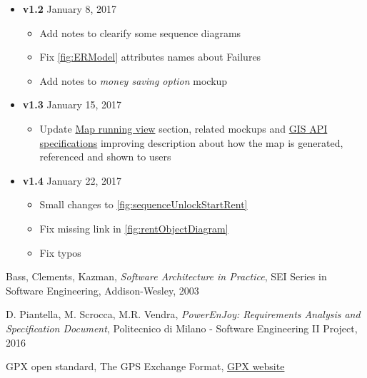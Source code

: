 \begin{appendices}
\begin{itemize}
\begin{itemize}
		\end{itemize}
		\item \textbf{v1.2} January 8, 2017
		\begin{itemize}
			\item Add notes to clearify some sequence diagrams
			\item Fix \autoref{fig:ERModel} attributes names about Failures
			\item Add notes to \emph{money saving option} mockup
		\end{itemize}
		\item  \textbf{v1.3} January 15, 2017
		\begin{itemize}
			\item Update \hyperref[sec:mapRunView]{Map running view} section, related mockups and \hyperref[sec:gis]{GIS API specifications} improving description about how the map is generated, referenced  and shown to users
		\end{itemize}
		\item  \textbf{v1.4} January 22, 2017
		\begin{itemize}
			\item Small changes to \autoref{fig:sequenceUnlockStartRent}
			\item Fix missing link in \autoref{fig:rentObjectDiagram}
			\item Fix typos 
		\end{itemize}
	\end{itemize}
	
\end{appendices}


\begin{thebibliography}{9}

Bass, Clements, Kazman, \emph{Software Architecture in Practice}, SEI Series in Software Engineering, Addison-­Wesley, 2003

D. Piantella, M. Scrocca, M.R. Vendra, \emph{PowerEnJoy: Requirements Analysis and Specification Document}, Politecnico di Milano - Software Engineering II Project, 2016

GPX open standard, The GPS Exchange Format, \href{http://www.topografix.com/gpx.asp}{GPX website}
\end{thebibliography}